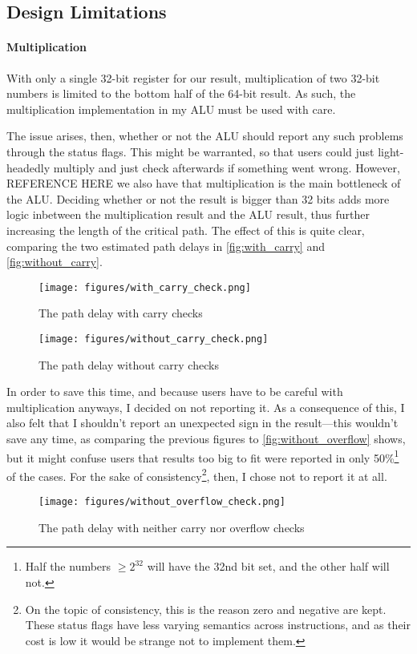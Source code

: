 \documentclass{article}
\begin{document}
\subsection{Design Limitations}
\label{subsec:limitations}

\paragraph{Multiplication}
With only a single 32-bit register for our result, multiplication of two 32-bit numbers is limited to the bottom half of the 64-bit result. As such, the multiplication implementation in my ALU must be used with care. 

The issue arises, then, whether or not the ALU should report any such problems through the status flags. This might be warranted, so that users could just light-headedly multiply and just check afterwards if something went wrong. However, REFERENCE HERE we also have that multiplication is the main bottleneck of the ALU. Deciding whether or not the result is bigger than 32 bits adds more logic inbetween the multiplication result and the ALU result, thus further increasing the length of the critical path. The effect of this is quite clear, comparing the two estimated path delays in \autoref{fig:with_carry} and \autoref{fig:without_carry}.
\begin{figure}[htbp]
  \centering
  \texttt{[image: figures/with\_carry\_check.png]}
  \caption{The path delay with carry checks}
  \label{fig:with_carry}
\end{figure}
\begin{figure}[htbp]
  \centering
  \texttt{[image: figures/without\_carry\_check.png]}
  \caption{The path delay without carry checks}
  \label{fig:without_carry}
\end{figure} 
In order to save this time, and because users have to be careful with multiplication anyways, I decided on not reporting it. As a consequence of this, I also felt that I shouldn't report an unexpected sign in the result---this wouldn't save any time, as comparing the previous figures to \autoref{fig:without_overflow} shows, but it might confuse users that results too big to fit were reported in only 50\%\footnote{Half the numbers $\geq 2^{32}$ will have the 32nd bit set, and the other half will not.} of the cases. For the sake of consistency\footnote{On the topic of consistency, this is the reason zero and negative are kept. These status flags have less varying semantics across instructions, and as their cost is low it would be strange not to implement them.}, then, I chose not to report it at all.
\begin{figure}[htbp]
  \centering
  \texttt{[image: figures/without\_overflow\_check.png]}
  \caption{The path delay with neither carry nor overflow checks}
  \label{fig:without_overflow}
\end{figure}
\end{document}
